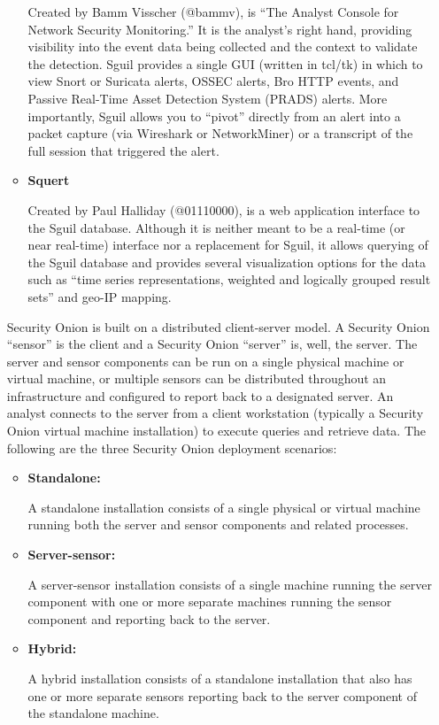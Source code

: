 \begin{itemize}[label=]
\begin{itemize}
        Created by Bamm Visscher (@bammv), is “The Analyst Console for Network Security Monitoring.” It is the analyst’s right hand, providing visibility into the event data being collected and the context to validate the detection. Sguil provides a single GUI (written in tcl/tk) in which to view Snort or Suricata alerts, OSSEC alerts, Bro HTTP events, and Passive Real-Time Asset Detection System (PRADS) alerts. More importantly, Sguil allows you to “pivot” directly from an alert into a packet capture (via Wireshark or NetworkMiner) or a transcript of the full session that triggered the alert.
        
        \item\textbf{Squert}
        
        Created by Paul Halliday (@01110000), is a web application interface to the Sguil database. Although it is neither meant to be a real-time (or near real-time) interface nor a replacement for Sguil, it allows querying of the Sguil database and provides several visualization options for the data such as “time series representations, weighted and logically grouped result sets” and geo-IP mapping.
\end{itemize}


Security Onion is built on a distributed client-server model. A Security Onion “sensor” is the client and a Security Onion “server” is, well, the server. The server and sensor components can be run on a single physical machine or virtual machine, or multiple sensors can be distributed throughout an infrastructure and configured to report back to a designated server. An analyst connects to the server from a client workstation (typically a Security Onion virtual machine installation) to execute queries and retrieve data.
The following are the three Security Onion deployment scenarios:
    \begin{itemize}
    \item\textbf{Standalone:}
    
    A standalone installation consists of a single physical or virtual machine running both the server and sensor components and related processes. 
    \item\textbf{Server-sensor:}
    
    A server-sensor installation consists of a single machine running the server component with one or more separate machines running the sensor component and reporting back to the server.
    \item\textbf{Hybrid:}
    
    A hybrid installation consists of a standalone installation that also has one or more separate sensors reporting back to the server component of the standalone machine.
    \end{itemize}

\end{itemize}


